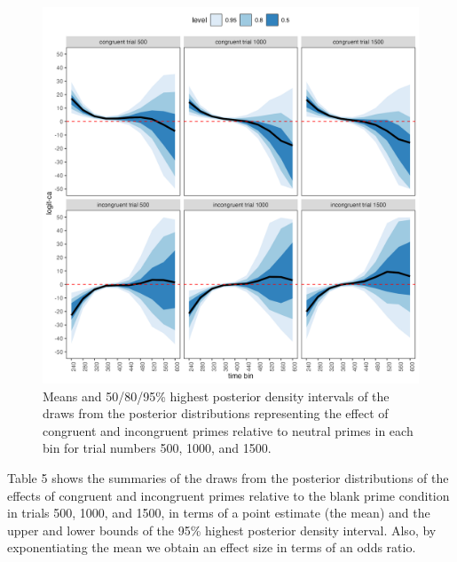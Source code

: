 \documentclass[
  man,floatsintext]{apa6}
\begin{document}
\begin{figure}[H]

{\centering \includegraphics[width=0.8\linewidth,height=0.67\textheight,]{../Tutorial_2_Bayesian/figures/M4_ca_effects_con_incon_3trials} 

}

\caption{Means and 50/80/95\% highest posterior density intervals of the draws from the posterior distributions representing the effect of congruent and incongruent primes relative to neutral primes in each bin for trial numbers 500, 1000, and 1500.}\label{fig:plot-prime-ca-effects}
\end{figure}

Table 5 shows the summaries of the draws from the posterior distributions of the effects of congruent and incongruent primes relative to the blank prime condition in trials 500, 1000, and 1500, in terms of a point estimate (the mean) and the upper and lower bounds of the 95\% highest posterior density interval. Also, by exponentiating the mean we obtain an effect size in terms of an odds ratio.
\end{document}

